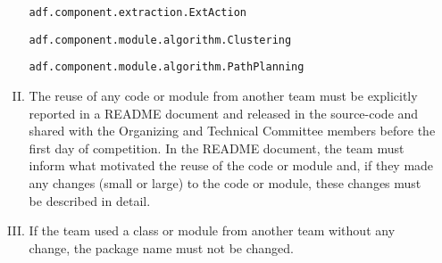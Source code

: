 \documentclass{article}
\begin{document}
\begin{enumerate}[(a)]
\begin{enumerate}[I.]
  \texttt{adf.component.extraction.ExtAction}

  \texttt{adf.component.module.algorithm.Clustering}

  \texttt{adf.component.module.algorithm.PathPlanning}
  \item The reuse of any code or module from another team must be explicitly reported in a README document and released in the source-code and shared with the Organizing and Technical Committee members before the first day of competition. In the README document, the team must inform what motivated the reuse of the code or module and, if they made any changes (small or large) to the code or module, these changes must be described in detail.
  \item If the team used a class or module from another team without any change, the package name must not be changed.
\end{enumerate}


\end{enumerate}
\end{document}
